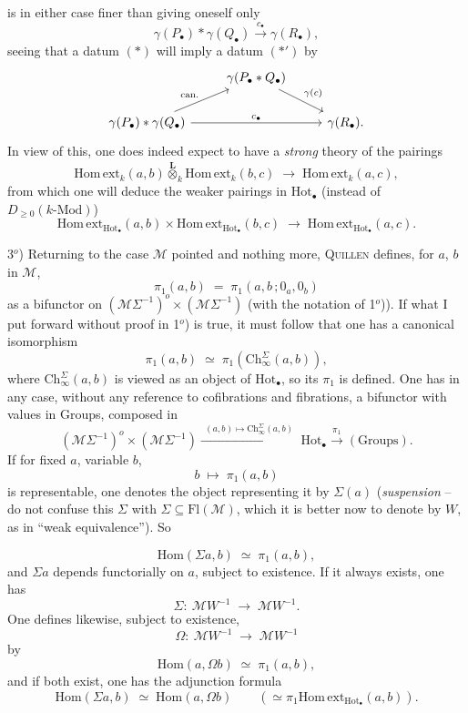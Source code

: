 \documentclass[11pt]{article}
\newcommand{\printedpage}[1]{\marginpar{\footnotesize p.~#1}}
\newcommand{\msp}[1]{\marginpar{\footnotesize [#1]}}
\newcommand{\M}{\mathcal{M}}
\newcommand{\Hot}{\mathrm{Hot}}
\newcommand{\Ch}{\mathrm{Ch}}
\newcommand{\Homext}{\mathrm{Hom\,ext}}
\newcommand{\Lotimes}{\overset{\mathbf{L}}{\otimes}}
\begin{document}
is in either case finer than giving oneself only
\[
\gamma(P_{\bullet}) * \gamma(Q_{\bullet}) \xrightarrow{\ c_{\bullet}\ } \gamma(R_{\bullet}), \tag*{$(*')$}
\]
seeing that a datum $(*)$ will imply a datum $(*')$ by %
\[
\begin{tikzcd}
 & \gamma(P_{\bullet} * Q_{\bullet}) \arrow[dr, "\gamma(c)"] & \\
\gamma(P_{\bullet}) * \gamma(Q_{\bullet}) \arrow[ur, "\text{can.}"] \arrow[rr, "c_{\bullet}"] & & \gamma(R_{\bullet}).
\end{tikzcd}
\]
In view of this, one does indeed expect to have a \textit{strong} theory of the pairings
\printedpage{13}
\msp{page 21}
\[
\Homext_k(a,b) \Lotimes_k \Homext_k(b,c) \;\longrightarrow\; \Homext_k(a,c),
\]
from which one will deduce the weaker pairings in $\Hot_{\bullet}$ (instead of $D_{\geq 0}(k\text{-Mod})$)
\[
\Homext_{\Hot_{\bullet}}(a,b) \times \Homext_{\Hot_{\bullet}}(b,c) \;\longrightarrow\; \Homext_{\Hot_{\bullet}}(a,c).
\]

3$^o$) Returning to the case $\M$ pointed and nothing more, \textsc{Quillen} defines, for $a$, $b$ in $\M$,
\[
\pi_1(a,b) \;=\; \pi_1(a,b\,;0_a,0_b)
\]
as a bifunctor on $(\M\Sigma^{-1})^o\times(\M\Sigma^{-1})$ (with the notation of 1$^o$)). If what I put forward without proof in 1$^o$) is true, it must follow that one has a canonical isomorphism
\[
\pi_1(a,b) \;\simeq\; \pi_1(\Ch^{\Sigma}_{\infty}(a,b)),
\]
where $\Ch^{\Sigma}_{\infty}(a,b)$ is viewed as an object of $\Hot_{\bullet}$, so its $\pi_1$ is defined. One has in any case, without any reference to cofibrations and fibrations, a bifunctor with values in Groups, composed in
\[
(\M\Sigma^{-1})^o\times(\M\Sigma^{-1}) \xrightarrow{\ \ (a,b)\longmapsto \Ch^{\Sigma}_{\infty}(a,b)\ \ } \Hot_{\bullet} \xrightarrow{\ \pi_1\ } (\text{Groups}).
\]
If for fixed $a$, variable $b$,
\[
b \;\longmapsto\; \pi_1(a,b)
\]
is representable, one denotes the object representing it by $\Sigma(a)$ (\textit{suspension} -- do not confuse this $\Sigma$ with $\Sigma \subseteq \mathrm{Fl}(\M)$, which it is better now to denote by $W$, as in ``weak equivalence''). So

\msp{page 22}

\[
\mathrm{Hom}(\Sigma a,b) \;\simeq\; \pi_1(a,b),
\]
and $\Sigma a$ depends functorially on $a$, subject to existence. If it always exists, one has
\[
\Sigma :\ \M W^{-1} \;\longrightarrow\; \M W^{-1}.
\]
One defines likewise, subject to existence,
\[
\Omega :\ \M W^{-1} \;\longrightarrow\; \M W^{-1}
\]
by
\[
\mathrm{Hom}(a,\Omega b) \;\simeq\; \pi_1(a,b),
\]
and if both exist, one has the adjunction formula
\[
\mathrm{Hom}(\Sigma a,b) \;\simeq\; \mathrm{Hom}(a,\Omega b) \qquad (\simeq \pi_1\Homext_{\Hot_{\bullet}}(a,b)).
\]
\end{document}

